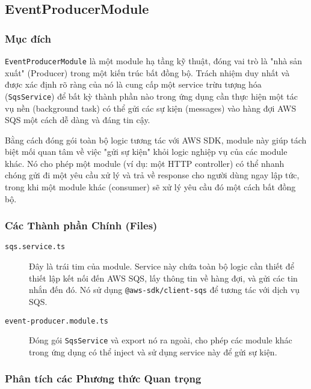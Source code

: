 \subsection{EventProducerModule}
\label{subsec:eventproducer-module}

\subsubsection{Mục đích}

\texttt{EventProducerModule} là một module hạ tầng kỹ thuật, đóng vai trò là "nhà sản xuất" (Producer) trong một kiến trúc bất đồng bộ. Trách nhiệm duy nhất và được xác định rõ ràng của nó là cung cấp một service trừu tượng hóa (\texttt{SqsService}) để bất kỳ thành phần nào trong ứng dụng cần thực hiện một tác vụ nền (background task) có thể gửi các sự kiện (messages) vào hàng đợi AWS SQS một cách dễ dàng và đáng tin cậy.

Bằng cách đóng gói toàn bộ logic tương tác với AWS SDK, module này giúp tách biệt mối quan tâm về việc "gửi sự kiện" khỏi logic nghiệp vụ của các module khác. Nó cho phép một module (ví dụ: một HTTP controller) có thể nhanh chóng gửi đi một yêu cầu xử lý và trả về response cho người dùng ngay lập tức, trong khi một module khác (consumer) sẽ xử lý yêu cầu đó một cách bất đồng bộ.

\subsubsection{Các Thành phần Chính (Files)}

\begin{description}
    \item[\texttt{sqs.service.ts}] Đây là trái tim của module. Service này chứa toàn bộ logic cần thiết để thiết lập kết nối đến AWS SQS, lấy thông tin về hàng đợi, và gửi các tin nhắn đến đó. Nó sử dụng \texttt{@aws-sdk/client-sqs} để tương tác với dịch vụ SQS.
    
    \item[\texttt{event-producer.module.ts}] Đóng gói \texttt{SqsService} và export nó ra ngoài, cho phép các module khác trong ứng dụng có thể inject và sử dụng service này để gửi sự kiện.
\end{description}

\subsubsection{Phân tích các Phương thức Quan trọng}


